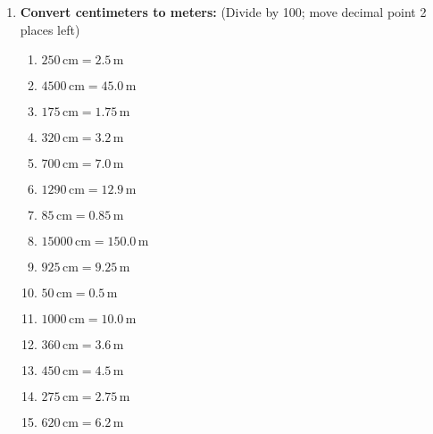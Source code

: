 \documentclass[12pt]{article}
\begin{document}
\begin{enumerate}
    \item \textbf{Convert centimeters to meters:}
    (Divide by 100; move decimal point 2 places left)
    \begin{multicols}{2}
    \begin{enumerate}
        \item \(250 \, \text{cm} = 2.5 \, \text{m}\)
        \item \(4500 \, \text{cm} = 45.0 \, \text{m}\)
        \item \(175 \, \text{cm} = 1.75 \, \text{m}\)
        \item \(320 \, \text{cm} = 3.2 \, \text{m}\)
        \item \(700 \, \text{cm} = 7.0 \, \text{m}\)
        \item \(1290 \, \text{cm} = 12.9 \, \text{m}\)
        \item \(85 \, \text{cm} = 0.85 \, \text{m}\)
        \item \(15000 \, \text{cm} = 150.0 \, \text{m}\)
        \item \(925 \, \text{cm} = 9.25 \, \text{m}\)
        \item \(50 \, \text{cm} = 0.5 \, \text{m}\)
        \item \(1000 \, \text{cm} = 10.0 \, \text{m}\)
        \item \(360 \, \text{cm} = 3.6 \, \text{m}\)
        \item \(450 \, \text{cm} = 4.5 \, \text{m}\)
        \item \(275 \, \text{cm} = 2.75 \, \text{m}\)
        \item \(620 \, \text{cm} = 6.2 \, \text{m}\)
    \end{enumerate}
    \end{multicols}


\end{enumerate}
\end{document}
